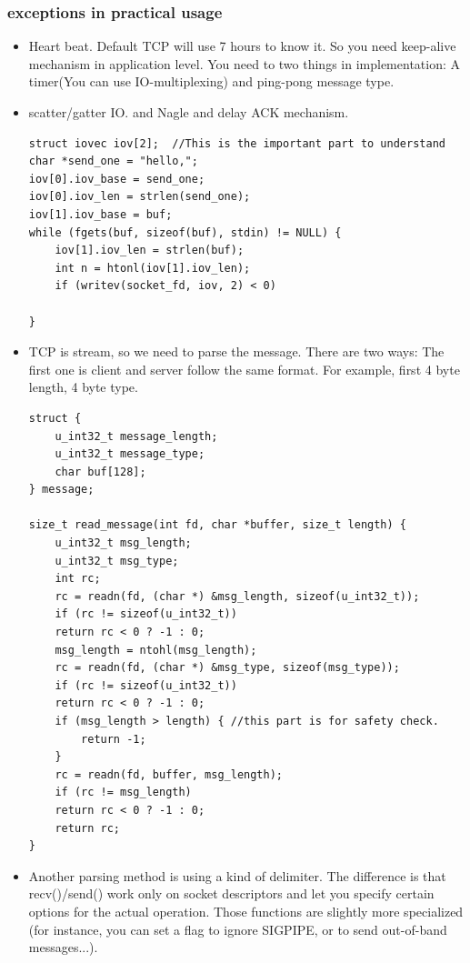 \documentclass[a4paper,11pt,twoside]{book}
\begin{document}
\subsubsection{exceptions in practical usage}
\begin{itemize}
	\item Heart beat. Default TCP will use 7 hours to know it. So you need keep-alive mechanism in application level. You need to two things in implementation: A timer(You can use IO-multiplexing) and ping-pong message type.
	
	\item scatter/gatter IO. and Nagle and delay ACK mechanism. 
\begin{lstlisting}
struct iovec iov[2];  //This is the important part to understand
char *send_one = "hello,";
iov[0].iov_base = send_one;
iov[0].iov_len = strlen(send_one);
iov[1].iov_base = buf;
while (fgets(buf, sizeof(buf), stdin) != NULL) {
	iov[1].iov_len = strlen(buf);
	int n = htonl(iov[1].iov_len);
	if (writev(socket_fd, iov, 2) < 0)
	
}
\end{lstlisting}

\item TCP is stream, so we need to parse the message. There are two ways: The first one is client and server follow the same format. For example, first 4 byte length, 4 byte type.  

\begin{lstlisting}
struct {
	u_int32_t message_length;
	u_int32_t message_type;
	char buf[128];
} message;

size_t read_message(int fd, char *buffer, size_t length) {
	u_int32_t msg_length;
	u_int32_t msg_type;
	int rc;
	rc = readn(fd, (char *) &msg_length, sizeof(u_int32_t));
	if (rc != sizeof(u_int32_t))
	return rc < 0 ? -1 : 0;
	msg_length = ntohl(msg_length);
	rc = readn(fd, (char *) &msg_type, sizeof(msg_type));
	if (rc != sizeof(u_int32_t))
	return rc < 0 ? -1 : 0;
	if (msg_length > length) { //this part is for safety check. 
		return -1;
	}
	rc = readn(fd, buffer, msg_length);
	if (rc != msg_length)
	return rc < 0 ? -1 : 0;
	return rc;
}
\end{lstlisting}

\item Another parsing method is using a kind of delimiter. The difference is that recv()/send() work only on socket descriptors and let you specify certain options for the actual operation. Those functions are slightly more specialized (for instance, you can set a flag to ignore SIGPIPE, or to send out-of-band messages...).


\end{itemize}
\end{document}
